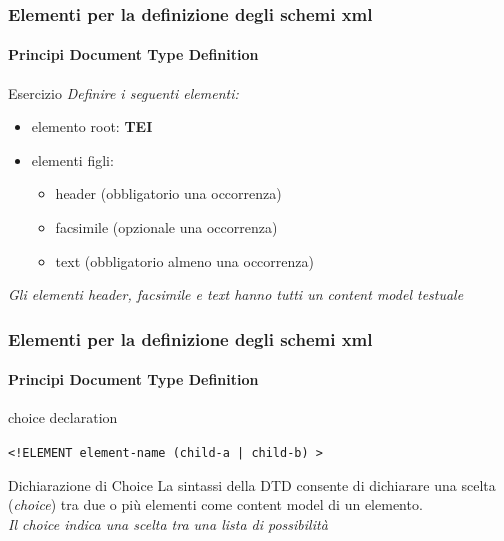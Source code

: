 \begin{frame}
    \frametitle{Elementi per la definizione degli schemi xml}
    \framesubtitle{Principi Document Type Definition}
    \addtocounter{nframe}{1}

    \begin{block}{Esercizio}
        \textit{Definire i seguenti elementi:}
        \begin{itemize}
            \item elemento root: \textbf{TEI}
            \item elementi figli:
            \begin{itemize}
                \item header (obbligatorio una occorrenza)
                \item facsimile (opzionale una occorrenza)
                \item text (obbligatorio almeno una occorrenza)
            \end{itemize}
        \end{itemize}
        \textit{Gli elementi header, facsimile e text hanno tutti un content model testuale}
    \end{block}
\end{frame}


\begin{frame}
    \frametitle{Elementi per la definizione degli schemi xml}
    \framesubtitle{Principi Document Type Definition}
    \addtocounter{nframe}{1}

    \begin{block}{choice declaration}
    \begin{center} \texttt{<!ELEMENT element-name (child-a | child-b) >} \end{center}
    \end{block}

    \begin{block}{Dichiarazione di Choice}
        La sintassi della DTD consente di dichiarare una scelta (\textit{choice}) tra due o più elementi come content model di un elemento. 
        \\ \textit{Il choice indica una scelta tra una lista di possibilità}
    \end{block}

\end{frame}

